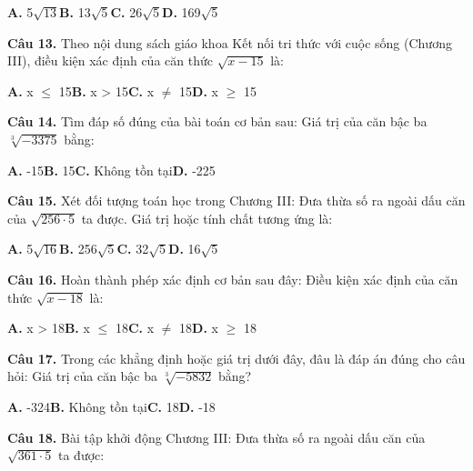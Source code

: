 \documentclass[11pt,a4paper]{article}
\begin{document}
\hspace*{1.5em}\textbf{A.} 5$\sqrt{13}$\quad\quad \textbf{B.} 13$\sqrt{5}$\quad\quad \textbf{C.} 26$\sqrt{5}$\quad\quad \textbf{D.} 169$\sqrt{5}$\par\vspace{2pt}
\textbf{\color{primary} Câu 13.} Theo nội dung sách giáo khoa Kết nối tri thức với cuộc sống (Chương III), điều kiện xác định của căn thức $\sqrt{x - 15}$ là:\par
\hspace*{1.5em}\textbf{A.} x $\le$ 15\quad\quad \textbf{B.} x > 15\quad\quad \textbf{C.} x $\ne$ 15\quad\quad \textbf{D.} x $\ge$ 15\par\vspace{2pt}
\textbf{\color{primary} Câu 14.} Tìm đáp số đúng của bài toán cơ bản sau: Giá trị của căn bậc ba $\sqrt[3]{-3375}$ bằng:\par
\hspace*{1.5em}\textbf{A.} -15\quad\quad \textbf{B.} 15\quad\quad \textbf{C.} Không tồn tại\quad\quad \textbf{D.} -225\par\vspace{2pt}
\textbf{\color{primary} Câu 15.} Xét đối tượng toán học trong Chương III: Đưa thừa số ra ngoài dấu căn của $\sqrt{256  \cdot  5}$ ta được. Giá trị hoặc tính chất tương ứng là:\par
\hspace*{1.5em}\textbf{A.} 5$\sqrt{16}$\quad\quad \textbf{B.} 256$\sqrt{5}$\quad\quad \textbf{C.} 32$\sqrt{5}$\quad\quad \textbf{D.} 16$\sqrt{5}$\par\vspace{2pt}
\textbf{\color{primary} Câu 16.} Hoàn thành phép xác định cơ bản sau đây: Điều kiện xác định của căn thức $\sqrt{x - 18}$ là:\par
\hspace*{1.5em}\textbf{A.} x > 18\quad\quad \textbf{B.} x $\le$ 18\quad\quad \textbf{C.} x $\ne$ 18\quad\quad \textbf{D.} x $\ge$ 18\par\vspace{2pt}
\textbf{\color{primary} Câu 17.} Trong các khẳng định hoặc giá trị dưới đây, đâu là đáp án đúng cho câu hỏi: Giá trị của căn bậc ba $\sqrt[3]{-5832}$ bằng?\par
\hspace*{1.5em}\textbf{A.} -324\quad\quad \textbf{B.} Không tồn tại\quad\quad \textbf{C.} 18\quad\quad \textbf{D.} -18\par\vspace{2pt}
\textbf{\color{primary} Câu 18.} Bài tập khởi động Chương III: Đưa thừa số ra ngoài dấu căn của $\sqrt{361  \cdot  5}$ ta được:\par
\end{document}
